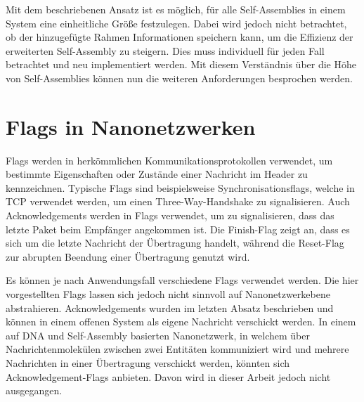 Mit dem beschriebenen Ansatz ist es möglich, für alle Self-Assemblies in einem System eine einheitliche Größe festzulegen. Dabei wird jedoch nicht betrachtet, ob der hinzugefügte Rahmen Informationen speichern kann, um die Effizienz der erweiterten Self-Assembly zu steigern. Dies muss individuell für jeden Fall betrachtet und neu implementiert werden. Mit diesem Verständnis über die Höhe von Self-Assemblies können nun die weiteren Anforderungen besprochen werden.

\section{Flags in Nanonetzwerken}
\label{sec:flags}
Flags werden in herkömmlichen Kommunikationsprotokollen verwendet, um bestimmte Eigenschaften oder Zustände einer Nachricht im Header zu kennzeichnen. Typische Flags sind beispielsweise Synchronisationsflags, welche in TCP verwendet werden, um einen Three-Way-Handshake zu signalisieren. Auch Acknowledgements werden in Flags verwendet, um zu signalisieren, dass das letzte Paket beim Empfänger angekommen ist. Die Finish-Flag zeigt an, dass es sich um die letzte Nachricht der Übertragung handelt, während die Reset-Flag zur abrupten Beendung einer Übertragung genutzt wird. 

Es können je nach Anwendungsfall verschiedene Flags verwendet werden. Die hier vorgestellten Flags lassen sich jedoch nicht sinnvoll auf Nanonetzwerkebene abstrahieren. Acknowledgements wurden im letzten Absatz beschrieben und können in einem offenen System als eigene Nachricht verschickt werden. In einem auf DNA und Self-Assembly basierten Nanonetzwerk, in welchem über Nachrichtenmolekülen zwischen zwei Entitäten kommuniziert wird und mehrere Nachrichten in einer Übertragung verschickt werden, könnten sich Acknowledgement-Flags anbieten. Davon wird in dieser Arbeit jedoch nicht ausgegangen. 

